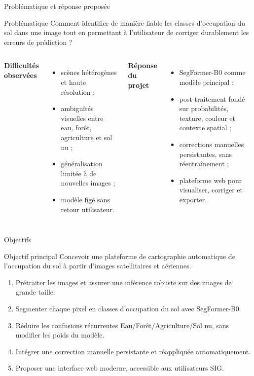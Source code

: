 \documentclass[10pt,aspectratio=169]{beamer}
\begin{document}
\begin{frame}{Problématique et réponse proposée}
  \begin{block}{Problématique}
    Comment identifier de manière fiable les classes d'occupation du sol dans une image tout en permettant à l'utilisateur de corriger durablement les erreurs de prédiction ?
  \end{block}
  \vspace{0.25cm}
  \begin{columns}[T]
      \textbf{Difficultés observées}
      \begin{itemize}
        \item scènes hétérogènes et haute résolution ;
        \item ambiguïtés visuelles entre eau, forêt, agriculture et sol nu ;
        \item généralisation limitée à de nouvelles images ;
        \item modèle figé sans retour utilisateur.
      \end{itemize}
      \textbf{Réponse du projet}
      \begin{itemize}
        \item SegFormer-B0 comme modèle principal ;
        \item post-traitement fondé sur probabilités, texture, couleur et contexte spatial ;
        \item corrections manuelles persistantes, sans réentraînement ;
        \item plateforme web pour visualiser, corriger et exporter.
      \end{itemize}
  \end{columns}
\end{frame}

\begin{frame}{Objectifs}
  \begin{block}{Objectif principal}
    Concevoir une plateforme de cartographie automatique de l'occupation du sol à partir d'images satellitaires et aériennes.
  \end{block}
  \begin{enumerate}
    \item Prétraiter les images et assurer une inférence robuste sur des images de grande taille.
    \item Segmenter chaque pixel en classes d'occupation du sol avec SegFormer-B0.
    \item Réduire les confusions récurrentes Eau/Forêt/Agriculture/Sol nu, sans modifier les poids du modèle.
    \item Intégrer une correction manuelle persistante et réappliquée automatiquement.
    \item Proposer une interface web moderne, accessible aux utilisateurs SIG.
  \end{enumerate}
\end{frame}
\end{document}
